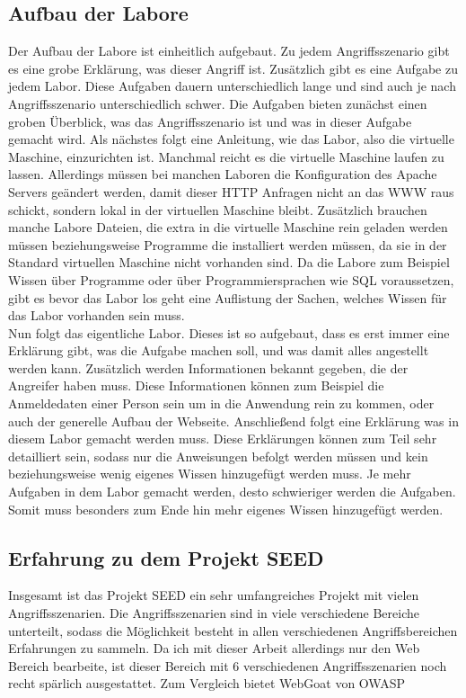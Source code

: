 \subsection{Aufbau der Labore}
Der Aufbau der Labore ist einheitlich aufgebaut. Zu jedem Angriffsszenario gibt es eine grobe Erklärung, was dieser Angriff ist. Zusätzlich gibt es eine Aufgabe zu jedem Labor. Diese Aufgaben dauern unterschiedlich lange und sind auch je nach Angriffsszenario unterschiedlich schwer. Die Aufgaben bieten zunächst einen groben Überblick, was das Angriffsszenario ist und was in dieser Aufgabe gemacht wird. Als nächstes folgt eine Anleitung, wie das Labor, also die virtuelle Maschine, einzurichten ist. Manchmal reicht es die virtuelle Maschine laufen zu lassen. Allerdings müssen bei manchen Laboren die Konfiguration des Apache Servers geändert werden, damit dieser HTTP Anfragen nicht an das WWW raus schickt, sondern lokal in der virtuellen Maschine bleibt. Zusätzlich brauchen manche Labore Dateien, die extra in die virtuelle Maschine rein geladen werden müssen beziehungsweise Programme die installiert werden müssen, da sie in der Standard virtuellen Maschine nicht vorhanden sind. Da die Labore zum Beispiel Wissen über Programme oder über Programmiersprachen wie SQL voraussetzen, gibt es bevor das Labor los geht eine Auflistung der Sachen, welches Wissen für das Labor vorhanden sein muss. \\
Nun folgt das eigentliche Labor. Dieses ist so aufgebaut, dass es erst immer eine Erklärung gibt, was die Aufgabe machen soll, und was damit alles angestellt werden kann. Zusätzlich werden Informationen bekannt gegeben, die der Angreifer haben muss. Diese Informationen können zum Beispiel die Anmeldedaten einer Person sein um in die Anwendung rein zu kommen, oder auch der generelle Aufbau der Webseite. Anschließend folgt eine Erklärung was in diesem Labor gemacht werden muss. Diese Erklärungen können zum Teil sehr detailliert sein, sodass nur die Anweisungen befolgt werden müssen und kein beziehungsweise wenig eigenes Wissen hinzugefügt werden muss. Je mehr Aufgaben in dem Labor gemacht werden, desto schwieriger werden die Aufgaben. Somit muss besonders zum Ende hin mehr eigenes Wissen hinzugefügt werden. 
\subsection{Erfahrung zu dem Projekt SEED}
Insgesamt ist das Projekt SEED ein sehr umfangreiches Projekt mit vielen Angriffsszenarien. Die Angriffsszenarien sind in viele verschiedene Bereiche unterteilt, sodass die Möglichkeit besteht in allen verschiedenen Angriffsbereichen Erfahrungen zu sammeln. Da ich mit dieser Arbeit allerdings nur den Web Bereich bearbeite, ist dieser Bereich mit 6 verschiedenen Angriffsszenarien noch recht spärlich ausgestattet. Zum Vergleich bietet WebGoat von OWASP 